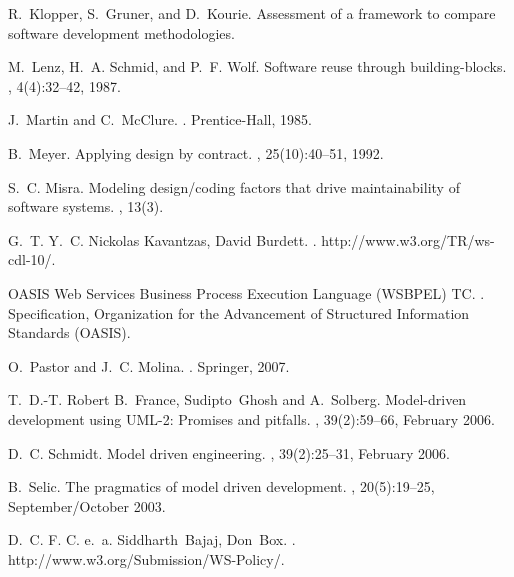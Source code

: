 \documentclass{IOS-Book-Article}
\begin{document}
\begin{thebibliography}{10}
R.~Klopper, S.~Gruner, and D.~Kourie.
\newblock Assessment of a framework to compare software development
  methodologies.

M.~Lenz, H.~A. Schmid, and P.~F. Wolf.
\newblock Software reuse through building-blocks.
, 4(4):32--42, 1987.

J.~Martin and C.~McClure.
.
\newblock Prentice-Hall, 1985.

B.~Meyer.
\newblock Applying design by contract.
, 25(10):40--51, 1992.

S.~C. Misra.
\newblock Modeling design/coding factors that drive maintainability of software
  systems.
, 13(3).

G.~T. Y.~C. {Nickolas Kavantzas}, {David Burdett}.
.
\newblock http://www.w3.org/TR/ws-cdl-10/.

{OASIS Web Services Business Process Execution Language (WSBPEL) TC}.
.
\newblock Specification, Organization for the Advancement of Structured
  Information Standards (OASIS).

O.~Pastor and J.~C. Molina.
.
\newblock Springer, 2007.

T.~D.-T. Robert B.~France, Sudipto~Ghosh and A.~Solberg.
\newblock Model-driven development using {UML}-2: Promises and pitfalls.
, 39(2):59--66, February 2006.

D.~C. Schmidt.
\newblock Model driven engineering.
, 39(2):25--31, February 2006.

B.~Selic.
\newblock The pragmatics of model driven development.
, 20(5):19--25, September/October 2003.

D.~C. F. C. e.~a. Siddharth~Bajaj, Don~Box.
.
\newblock http://www.w3.org/Submission/WS-Policy/.


\end{thebibliography}
\end{document}
